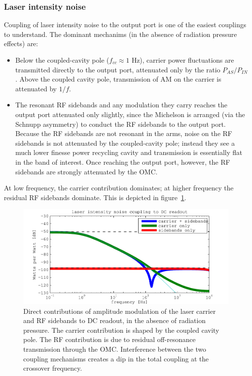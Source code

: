 \subsubsection{Laser intensity noise}

Coupling of laser intensity noise to the output port is one of the easiest
couplings to understand.  The dominant mechanims (in the absence of radiation
pressure effects) are:
%
\begin{itemize}
\item Below the coupled-cavity pole ($f_{cc}\approx 1$ Hz), carrier power
  fluctuations are transmitted directly to the output port, attenuated only by
  the ratio $P_{AS}/P_{IN}$.  Above the coupled cavity pole, transmission of AM
  on the carrier is attenuated by $1/f$.
\item The resonant RF sidebands and any modulation they carry reaches the output
  port attenuated only slightly, since the Michelson is arranged (via the
  Schnupp asymmetry) to conduct the RF sidebands to the output port.  Because
  the RF sidebands are not resonant in the arms, noise on the RF sidebands is
  not attenuated by the coupled-cavity pole; instead they see a much lower
  finesse power recycling cavity and transmission is essentially flat in the
  band of interest.  Once reaching the output port, however, the RF sidebands
  are strongly attenuated by the OMC.
\end{itemize}
At low frequency, the carrier contribution dominates; at higher
frequency the residual RF sidebands dominate.  This is depicted in
figure~\ref{fig:laser-AM-contributions}.

\begin{figure}
\includegraphics[width=\columnwidth]{notes/figures/srcam_contributions.pdf}
\caption[Components of laser intensity noise contribution to DC readout]{\label{fig:laser-AM-contributions}Direct contributions of
  amplitude modulation of the laser carrier and RF sidebands to DC
  readout, in the absence of radiation pressure.  The carrier
  contribution is shaped by the coupled cavity pole.  The RF
  contribution is due to residual off-resonance transmission through
  the OMC.  Interference between the two coupling mechanisms creates a
  dip in the total coupling at the crossover frequency.}
\end{figure}

